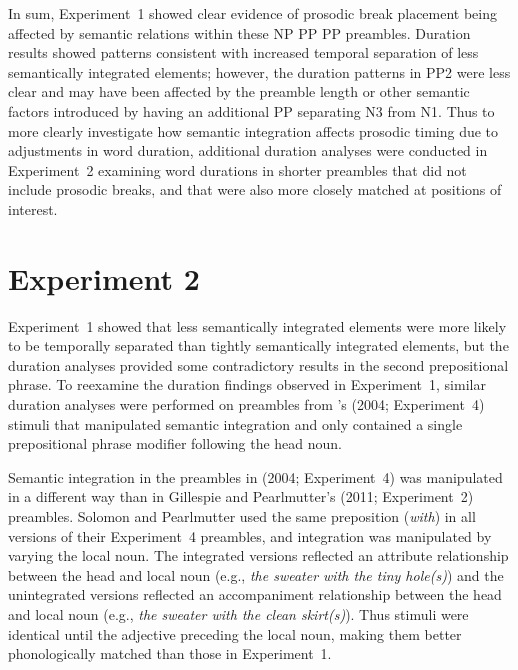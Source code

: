 \documentclass[12pt,titlepage]{article}
\begin{document}
In sum, Experiment~1 showed clear evidence of prosodic break placement being affected by semantic relations within these NP PP PP preambles. Duration results showed patterns consistent with increased temporal separation of less semantically integrated elements; however, the duration patterns in PP2 were less clear and may have been affected by the preamble length or other semantic factors introduced by having an additional PP separating N3 from N1.  Thus to more clearly investigate how semantic integration affects prosodic timing due to adjustments in word duration, additional duration analyses were conducted in Experiment~2 examining word durations in shorter preambles that did not include prosodic breaks, and that were also more closely matched at positions of interest.

\section{Experiment 2}

Experiment~1 showed that less semantically integrated elements were more likely to be temporally separated than tightly semantically integrated elements, but the duration analyses provided some contradictory results in the second prepositional phrase. To reexamine the duration findings observed in Experiment~1, similar duration analyses were performed on preambles from \citeauthor{SolomonPearlmutter04}'s (2004; Experiment~4) stimuli that manipulated semantic integration and only contained a single prepositional phrase modifier following the head noun.

Semantic integration in the preambles in \citeauthor{SolomonPearlmutter04} (2004; Experiment~4) was manipulated in a different way than in Gillespie and Pearlmutter's (2011; Experiment~2) preambles. Solomon and Pearlmutter used the same preposition (\textit{with}) in all versions of their Experiment~4 preambles, and integration was manipulated by varying the local noun. The integrated versions reflected an attribute relationship between the head and local noun (e.g., \textit{the sweater with the tiny hole(s)}) and the unintegrated versions reflected an accompaniment relationship between the head and local noun (e.g., \textit{the sweater with the clean skirt(s)}). Thus stimuli were identical until the adjective preceding the local noun, making them better phonologically matched than those in Experiment~1.

\end{document}
